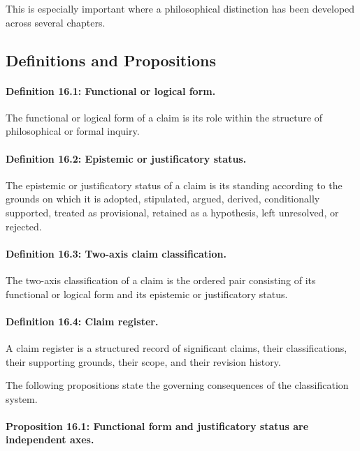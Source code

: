 This is
especially important
where a
philosophical
distinction has
been developed
across several
chapters.

\subsection{Definitions and Propositions}

\paragraph{Definition 16.1: Functional or logical form.}

The functional
or logical
form of
a claim
is its
role within
the structure
of philosophical
or formal
inquiry.

\paragraph{Definition 16.2: Epistemic or justificatory status.}

The epistemic
or justificatory
status of
a claim
is its
standing according
to the
grounds on
which it
is adopted,
stipulated, argued,
derived, conditionally
supported, treated
as provisional,
retained as
a hypothesis,
left unresolved,
or rejected.

\paragraph{Definition 16.3: Two-axis claim classification.}

The two-axis
classification of
a claim
is the
ordered pair
consisting of
its functional
or logical
form and
its epistemic
or justificatory
status.

\paragraph{Definition 16.4: Claim register.}

A claim
register is
a structured
record of
significant claims,
their classifications,
their supporting
grounds, their
scope, and
their revision
history.

The following
propositions state
the governing
consequences of
the classification
system.

\paragraph{Proposition 16.1: Functional form and justificatory status are independent axes.}

